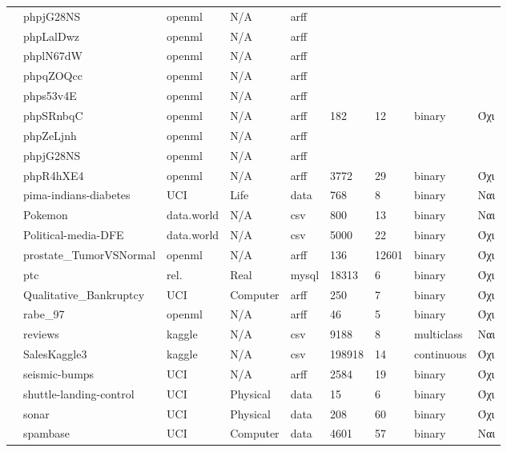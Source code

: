 {\begin{longtable}{|l| l| l | l | l | l |l | l | l | }
 			\rownumber & phpjG28NS & openml & N/A & arff & & & & \\
 			\rownumber & phpLalDwz & openml & N/A & arff & & & & \\
 			\rownumber & phplN67dW & openml & N/A & arff & & & & \\
 			\rownumber & phpqZOQcc & openml & N/A & arff & & & & \\
 			\rownumber & phps53v4E & openml & N/A & arff & & & & \\
 			\rownumber & phpSRnbqC \citep{planning} & openml & N/A & arff & 182 & 12 & binary & Όχι \\
 			\rownumber & phpZeLjnh & openml & N/A & arff & & & & \\
 			\rownumber & phpjG28NS & openml & N/A & arff & & & & \\
 			\rownumber & phpR4hXE4 & openml & N/A & arff & 3772 & 29 & binary & Όχι \\
 			\rownumber & pima-indians-diabetes \citep{pima} & UCI & Life & data & 768 & 8 & binary & Ναι \\
 			\rownumber & Pokemon & data.world& N/A& csv & 800 & 13 & binary& Ναι\\
 			\rownumber & Political-media-DFE & data.world & N/A & csv & 5000 & 22  & binary& Όχι \\
 			\rownumber & prostate\_TumorVSNormal & openml & N/A & arff & 136 & 12601  & binary & Όχι \\
 			\rownumber & ptc \citep{Helma2001} & rel.& Real  & mysql & 18313 & 6 & binary & Όχι \\
 			\rownumber & Qualitative\_Bankruptcy \citep{bankruptcy} & UCI & Computer & arff & 250 & 7 & binary & Όχι \\
 			\rownumber & rabe\_97 \citep{rabe} & openml & N/A & arff & 46 & 5 & binary & Όχι \\
 			\rownumber & reviews & kaggle & N/A & csv & 9188&8 & multiclass & Ναι \\
 			\rownumber & SalesKaggle3 \citep{sales} & kaggle & N/A & csv & 198918 & 14 & continuous & Όχι \\
 			\rownumber & seismic-bumps \citep{seismic} & UCI & N/A & arff & 2584 & 19& binary & Όχι \\
 			\rownumber & shuttle-landing-control \citep{shuttle} & UCI & Physical & data & 15  & 6 & binary &  Όχι \\
 				\rownumber & sonar & UCI & Physical & data & 208 & 60 & binary  & Όχι \\
 				\rownumber & spambase \citep{spam} & UCI & Computer & data & 4601 & 57 & binary & Ναι  \\

\end{longtable}}
